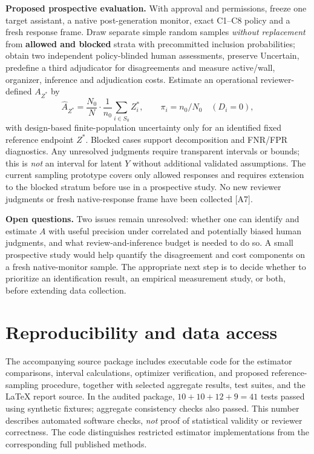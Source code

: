\documentclass[11pt,a4paper]{article}
\begin{document}
\textbf{Proposed prospective evaluation.} With approval and permissions, freeze one target assistant, a native post-generation monitor, exact C1--C8 policy and a fresh response frame. Draw separate simple random samples \emph{without replacement} from \textbf{allowed and blocked} strata with precommitted inclusion probabilities; obtain two independent policy-blinded human assessments, preserve Uncertain, predefine a third adjudicator for disagreements and measure active/wall, organizer, inference and adjudication costs. Estimate an operational reviewer-defined $A_{Z^*}$ by
\begin{equation}\label{eq:finite}
 \widehat A_{Z^*}=\frac{N_0}{N}\cdot\frac{1}{n_0}\sum_{i\in S_0} Z_i^*, \qquad \pi_i=n_0/N_0\quad (D_i=0),
\end{equation}
with design-based finite-population uncertainty only for an identified fixed reference endpoint $Z^*$. Blocked cases support decomposition and FNR/FPR diagnostics. Any unresolved judgments require transparent intervals or bounds; this is \emph{not} an interval for latent $Y$ without additional validated assumptions. The current sampling prototype covers only allowed responses and requires extension to the blocked stratum before use in a prospective study. No new reviewer judgments or fresh native-response frame have been collected [A7].

\textbf{Open questions.} Two issues remain unresolved: whether one can identify and estimate $A$ with useful precision under correlated and potentially biased human judgments, and what review-and-inference budget is needed to do so. A small prospective study would help quantify the disagreement and cost components on a fresh native-monitor sample. The appropriate next step is to decide whether to prioritize an identification result, an empirical measurement study, or both, before extending data collection.

\section{Reproducibility and data access}
The accompanying source package includes executable code for the estimator comparisons, interval calculations, optimizer verification, and proposed reference-sampling procedure, together with selected aggregate results, test suites, and the LaTeX report source. In the audited package, $10+10+12+9=41$ tests passed using synthetic fixtures; aggregate consistency checks also passed. This number describes automated software checks, \emph{not} proof of statistical validity or reviewer correctness. The code distinguishes restricted estimator implementations from the corresponding full published methods.
\end{document}
